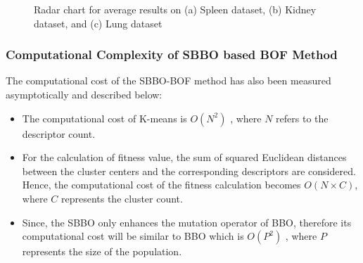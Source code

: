 \begin{figure}[t!]
\centering
{}
 \caption[Radar chart for average results on Spleen dataset, Kidney dataset, and Lung dataset]{\fontsize{10pt}{12pt}\selectfont Radar chart for average results on (a) Spleen dataset, (b) Kidney dataset, and (c) Lung dataset}
\label{ch4:fig:T3adl}
\end{figure}

\subsubsection{Computational Complexity of SBBO based BOF Method}
The computational cost of the SBBO-BOF method has also been measured asymptotically and described below:
\begin{itemize}
\item   The computational cost of K-means is $O(N^2)$ \cite{pakhira2004}, where $N$ refers to the descriptor count.

\item For the calculation of fitness value, the sum of squared Euclidean distances between the cluster centers and the corresponding descriptors are considered. Hence, the computational cost of the fitness calculation becomes $O (N \times C)$, where $C$ represents the cluster count.

\item  Since, the SBBO only enhances the mutation operator of BBO, therefore its computational cost will be similar to BBO which is $O(P^2)$ \cite{wang2014}, where $P$ represents the size of the population.

\end{itemize}

